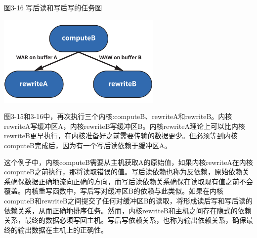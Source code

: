 \hspace*{\fill} \par %
图3-16 写后读和写后写的任务图
\begin{center}
	\includegraphics[width=0.6\textwidth]{content/chapter-3/images/9}
\end{center}

图3-15和3-16中，再次执行三个内核:computeB、rewriteA和rewriteB。内核rewriteA写缓冲区A，内核rewriteB写缓冲区B。内核rewriteA理论上可以比内核rewriteB更早执行，在内核准备好之前需要传输的数据更少。但必须等到内核computeB完成后，因为有一个写后读依赖于缓冲区A。\par

这个例子中，内核computeB需要从主机获取A的原始值，如果内核rewriteA在内核computeB之前执行，那将读取错误的值。写后读依赖也称为反依赖，原始依赖关系确保数据正确地流向正确的方向，而写后读依赖关系确保在读取现有值之前不会覆盖。内核重写函数中，写后写对缓冲区B的依赖与此类似。如果在内核computeB和rewriteB之间提交了任何对缓冲区B的读取，将形成读后写和写后读的依赖关系，从而正确地排序任务。然而，内核rewriteB和主机之间存在隐式的依赖关系，最终的数据必须写回主机。写后写依赖关系，也称为输出依赖关系，确保最终的输出数据在主机上的正确性。\par





















